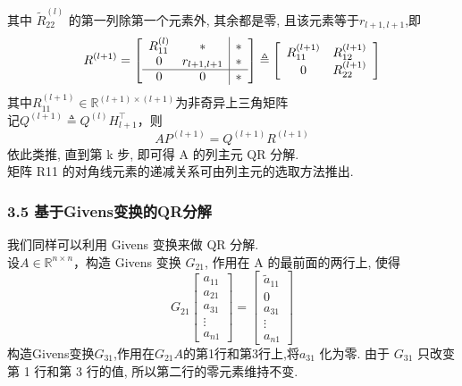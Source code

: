 \documentclass[notheorems,serif]{beamer}
\begin{document}
\begin{frame}
其中 $\tilde {R}_{22}^{(l)}$ 的第一列除第一个元素外, 其余都是零, 且该元素等于$r_{l+1,l+1}$,即
$$
R^{(l+1)}=\left[\begin{array}{c c |c c}{R_{11}^{(l)}} & {*} & {*} \\ {0} & {r_{l+1, l+1}} & {*} \\ \hline {0} & {0} & {*}\end{array}\right] \triangleq\left[\begin{array}{cc}{R_{11}^{(l+1)}} & {R_{12}^{(l+1)}} \\ {0} & {R_{22}^{(l+1)}}\end{array}\right]
$$
其中$R_{11}^{(l+1)} \in \mathbb{R}^{(l+1) \times(l+1)}$为非奇异上三角矩阵\\
记$Q^{(l+1)} \triangleq Q^{(l)} H_{l+1}^{\top}$，则
$$
A P^{(l+1)}=Q^{(l+1)} R^{(l+1)}
$$
依此类推, 直到第 k 步, 即可得 A 的列主元 QR 分解.\\
矩阵 R11 的对角线元素的递减关系可由列主元的选取方法推出.
\end{frame}

\begin{frame}
\frametitle{3.5 基于Givens变换的QR分解}
我们同样可以利用 Givens 变换来做 QR 分解.\\
设$A \in \mathbb{R}^{n \times n}$，构造 Givens 变换 $G_{21}$, 作用在 A 的最前面的两行上, 使得
$$
G_{21}\left[\begin{array}{c}{a_{11}} \\ {a_{21}} \\ {a_{31}} \\ {\vdots} \\ {a_{n 1}}\end{array}\right]=\left[\begin{array}{c}{\tilde{a}_{11}} \\ {0} \\ {a_{31}} \\ {\vdots} \\ {a_{n 1}}\end{array}\right]
$$
构造Givens变换$G_{31}$,作用在$G_{21}A$的第1行和第3行上,将$a_{31}$ 化为零. 由于 $G_{31}$ 只改变第 1 行和第 3 行的值, 所以第二行的零元素维持不变.
\end{frame}
\end{document}
